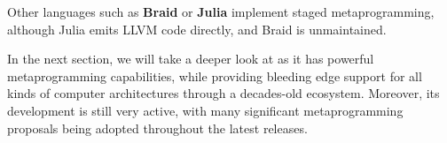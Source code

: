 \documentclass[../main]{subfiles}
\begin{document}
Other languages such as \textbf{Braid} \cite{braid} or
\textbf{Julia} \cite{julia} implement staged metaprogramming,
although Julia emits LLVM code directly, and Braid is unmaintained.

In the next section, we will take a deeper look at \cpp as it has
powerful metaprogramming capabilities, while providing bleeding edge support for
all kinds of computer architectures through a decades-old ecosystem. Moreover,
its development is still very active, with many significant metaprogramming
proposals being adopted throughout the latest releases.
\end{document}

